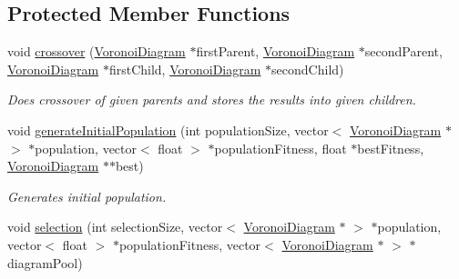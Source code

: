 \subsection*{Protected Member Functions}
\begin{DoxyCompactItemize}
\item 
void \hyperlink{classlossycompressor_1_1_evolutionary_algorithm_a212ab81cd050216479830b18d93ca853}{crossover} (\hyperlink{structlossycompressor_1_1_voronoi_diagram}{Voronoi\+Diagram} $\ast$first\+Parent, \hyperlink{structlossycompressor_1_1_voronoi_diagram}{Voronoi\+Diagram} $\ast$second\+Parent, \hyperlink{structlossycompressor_1_1_voronoi_diagram}{Voronoi\+Diagram} $\ast$first\+Child, \hyperlink{structlossycompressor_1_1_voronoi_diagram}{Voronoi\+Diagram} $\ast$second\+Child)\hypertarget{classlossycompressor_1_1_evolutionary_algorithm_a212ab81cd050216479830b18d93ca853}{}\label{classlossycompressor_1_1_evolutionary_algorithm_a212ab81cd050216479830b18d93ca853}

\begin{DoxyCompactList}\small\item\em Does crossover of given parents and stores the results into given children. \end{DoxyCompactList}\item 
void \hyperlink{classlossycompressor_1_1_evolutionary_algorithm_ad58c5cbe04826032c5b5ba86f3db9aa1}{generate\+Initial\+Population} (int population\+Size, vector$<$ \hyperlink{structlossycompressor_1_1_voronoi_diagram}{Voronoi\+Diagram} $\ast$ $>$ $\ast$population, vector$<$ float $>$ $\ast$population\+Fitness, float $\ast$best\+Fitness, \hyperlink{structlossycompressor_1_1_voronoi_diagram}{Voronoi\+Diagram} $\ast$$\ast$best)
\begin{DoxyCompactList}\small\item\em Generates initial population. \end{DoxyCompactList}\item 
void \hyperlink{classlossycompressor_1_1_evolutionary_algorithm_a9e97a1b8ad2befd1e42e28fd348062c2}{selection} (int selection\+Size, vector$<$ \hyperlink{structlossycompressor_1_1_voronoi_diagram}{Voronoi\+Diagram} $\ast$ $>$ $\ast$population, vector$<$ float $>$ $\ast$population\+Fitness, vector$<$ \hyperlink{structlossycompressor_1_1_voronoi_diagram}{Voronoi\+Diagram} $\ast$ $>$ $\ast$diagram\+Pool)\hypertarget{classlossycompressor_1_1_evolutionary_algorithm_a9e97a1b8ad2befd1e42e28fd348062c2}{}\label{classlossycompressor_1_1_evolutionary_algorithm_a9e97a1b8ad2befd1e42e28fd348062c2}


\end{DoxyCompactItemize}
